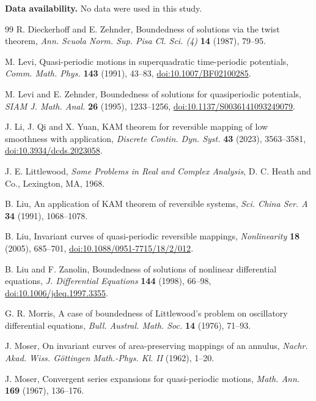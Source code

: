 \documentclass[11pt]{amsart}
\theoremstyle{remark}
\begin{document}
\textbf{Data availability.} No data were used in this study.

\begin{thebibliography}{99}
R. Dieckerhoff and E. Zehnder,
Boundedness of solutions via the twist theorem,
\emph{Ann. Scuola Norm. Sup. Pisa Cl. Sci. (4)} \textbf{14} (1987), 79--95.

M. Levi,
Quasi-periodic motions in superquadratic time-periodic potentials,
\emph{Comm. Math. Phys.} \textbf{143} (1991), 43--83,
\href{https://doi.org/10.1007/BF02100285}{doi:10.1007/BF02100285}.

M. Levi and E. Zehnder,
Boundedness of solutions for quasiperiodic potentials,
\emph{SIAM J. Math. Anal.} \textbf{26} (1995), 1233--1256,
\href{https://doi.org/10.1137/S0036141093249079}
{doi:10.1137/S0036141093249079}.

J. Li, J. Qi and X. Yuan,
KAM theorem for reversible mapping of low smoothness with application,
\emph{Discrete Contin. Dyn. Syst.} \textbf{43} (2023), 3563--3581,
\href{https://doi.org/10.3934/dcds.2023058}
{doi:10.3934/dcds.2023058}.

J. E. Littlewood,
\emph{Some Problems in Real and Complex Analysis},
D. C. Heath and Co., Lexington, MA, 1968.

B. Liu,
An application of KAM theorem of reversible systems,
\emph{Sci. China Ser. A} \textbf{34} (1991), 1068--1078.

B. Liu,
Invariant curves of quasi-periodic reversible mappings,
\emph{Nonlinearity} \textbf{18} (2005), 685--701,
\href{https://doi.org/10.1088/0951-7715/18/2/012}
{doi:10.1088/0951-7715/18/2/012}.

B. Liu and F. Zanolin,
Boundedness of solutions of nonlinear differential equations,
\emph{J. Differential Equations} \textbf{144} (1998), 66--98,
\href{https://doi.org/10.1006/jdeq.1997.3355}
{doi:10.1006/jdeq.1997.3355}.

G. R. Morris,
A case of boundedness of Littlewood's problem on oscillatory differential
equations,
\emph{Bull. Austral. Math. Soc.} \textbf{14} (1976), 71--93.

J. Moser,
On invariant curves of area-preserving mappings of an annulus,
\emph{Nachr. Akad. Wiss. G\"ottingen Math.-Phys. Kl. II} (1962), 1--20.

J. Moser,
Convergent series expansions for quasi-periodic motions,
\emph{Math. Ann.} \textbf{169} (1967), 136--176.


\end{thebibliography}
\end{document}
